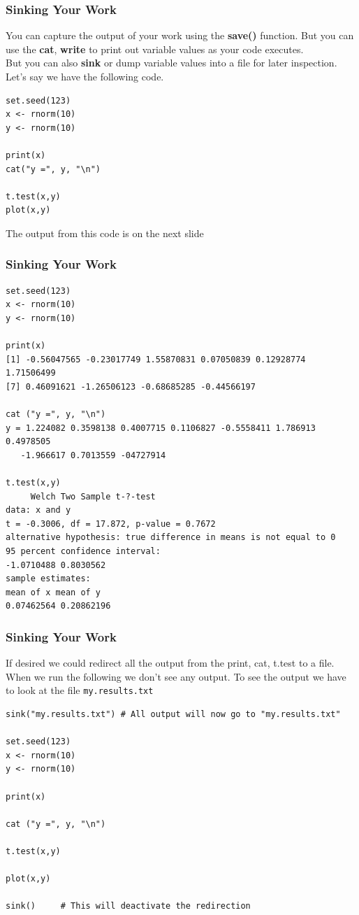 \documentclass{beamer}
\begin{document}
\begin{frame}[fragile]
\frametitle{Sinking Your Work}
\small
You can capture the output of your work using the \textbf{save()} function. But you can use the \textbf{cat}, \textbf{write} to print out variable values as your code executes. 
\newline
\\
But you can also \textbf{sink} or dump variable values into a file for later inspection. Let's say we have the following code.

\begin{verbatim}
set.seed(123)
x <- rnorm(10)
y <- rnorm(10)

print(x)
cat("y =", y, "\n")

t.test(x,y)
plot(x,y)
\end{verbatim}
The output from this code is on the next slide
\end{frame}


\begin{frame}[fragile]
\frametitle{Sinking Your Work}

\scriptsize
\begin{verbatim}
set.seed(123)
x <- rnorm(10)
y <- rnorm(10)

print(x)
[1] -0.56047565 -0.23017749 1.55870831 0.07050839 0.12928774 1.71506499
[7] 0.46091621 -1.26506123 -0.68685285 ‐0.44566197

cat ("y =", y, "\n")
y = 1.224082 0.3598138 0.4007715 0.1106827 ‐0.5558411 1.786913 0.4978505 
   -1.966617 0.7013559 -04727914

t.test(x,y)
     Welch Two Sample t-?‐test
data: x and y
t = -0.3006, df = 17.872, p-value = 0.7672
alternative hypothesis: true difference in means is not equal to 0
95 percent confidence interval:
-1.0710488 0.8030562
sample estimates:
mean of x mean of y
0.07462564 0.20862196
\end{verbatim}

\end{frame}


\begin{frame}[fragile]
\frametitle{Sinking Your Work}
If desired we could redirect all the output from the print, cat, t.test to a file.
When we run the following we don't see any output. To see the output we have to look at the file \texttt{my.results.txt}

\footnotesize
\begin{verbatim}
sink("my.results.txt") # All output will now go to "my.results.txt"

set.seed(123)
x <- rnorm(10)
y <- rnorm(10)

print(x)

cat ("y =", y, "\n")

t.test(x,y)

plot(x,y)

sink()     # This will deactivate the redirection
\end{verbatim}

\end{frame}
\end{document}
